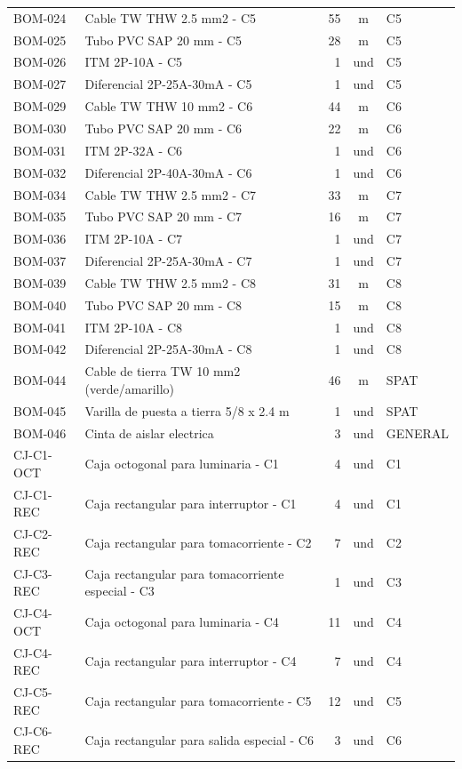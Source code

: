 \begin{landscape}
\begin{longtable}{p{1.7cm}p{9.0cm}r c p{1.8cm}}
BOM-024 & Cable TW THW 2.5 mm2 - C5 & 55 & m & C5 \\
BOM-025 & Tubo PVC SAP 20 mm - C5 & 28 & m & C5 \\
BOM-026 & ITM 2P-10A - C5 & 1 & und & C5 \\
BOM-027 & Diferencial 2P-25A-30mA - C5 & 1 & und & C5 \\
BOM-029 & Cable TW THW 10 mm2 - C6 & 44 & m & C6 \\
BOM-030 & Tubo PVC SAP 20 mm - C6 & 22 & m & C6 \\
BOM-031 & ITM 2P-32A - C6 & 1 & und & C6 \\
BOM-032 & Diferencial 2P-40A-30mA - C6 & 1 & und & C6 \\
BOM-034 & Cable TW THW 2.5 mm2 - C7 & 33 & m & C7 \\
BOM-035 & Tubo PVC SAP 20 mm - C7 & 16 & m & C7 \\
BOM-036 & ITM 2P-10A - C7 & 1 & und & C7 \\
BOM-037 & Diferencial 2P-25A-30mA - C7 & 1 & und & C7 \\
BOM-039 & Cable TW THW 2.5 mm2 - C8 & 31 & m & C8 \\
BOM-040 & Tubo PVC SAP 20 mm - C8 & 15 & m & C8 \\
BOM-041 & ITM 2P-10A - C8 & 1 & und & C8 \\
BOM-042 & Diferencial 2P-25A-30mA - C8 & 1 & und & C8 \\
BOM-044 & Cable de tierra TW 10 mm2 (verde/amarillo) & 46 & m & SPAT \\
BOM-045 & Varilla de puesta a tierra 5/8 x 2.4 m & 1 & und & SPAT \\
BOM-046 & Cinta de aislar electrica & 3 & und & GENERAL \\
CJ-C1-OCT & Caja octogonal para luminaria - C1 & 4 & und & C1 \\
CJ-C1-REC & Caja rectangular para interruptor - C1 & 4 & und & C1 \\
CJ-C2-REC & Caja rectangular para tomacorriente - C2 & 7 & und & C2 \\
CJ-C3-REC & Caja rectangular para tomacorriente especial - C3 & 1 & und & C3 \\
CJ-C4-OCT & Caja octogonal para luminaria - C4 & 11 & und & C4 \\
CJ-C4-REC & Caja rectangular para interruptor - C4 & 7 & und & C4 \\
CJ-C5-REC & Caja rectangular para tomacorriente - C5 & 12 & und & C5 \\
CJ-C6-REC & Caja rectangular para salida especial - C6 & 3 & und & C6 \\

\end{longtable}
\end{landscape}
